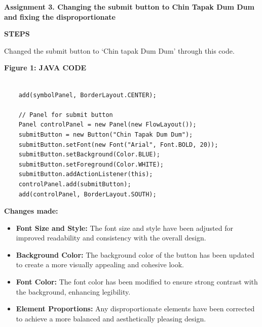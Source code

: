 \documentclass[a4paper,14pt]{article}
\begin{document}
\vspace{15pt}

\noindent\textbf{Assignment 3. Changing the submit button to Chin Tapak Dum Dum and fixing the disproportionate}

\vspace{15pt}
\begin{center}
\noindent\textbf{STEPS}

\vspace{15pt}

\noindent Changed the submit button to `Chin tapak Dum Dum' through this code.
\end{center}
\vspace{25pt}

\noindent\textbf{Figure 1: JAVA CODE}

\begin{verbatim}
    
    add(symbolPanel, BorderLayout.CENTER);
    
    // Panel for submit button
    Panel controlPanel = new Panel(new FlowLayout());
    submitButton = new Button("Chin Tapak Dum Dum");
    submitButton.setFont(new Font("Arial", Font.BOLD, 20));
    submitButton.setBackground(Color.BLUE);
    submitButton.setForeground(Color.WHITE);
    submitButton.addActionListener(this);
    controlPanel.add(submitButton);
    add(controlPanel, BorderLayout.SOUTH);

\end{verbatim}


\vspace{15pt}

\noindent\textbf{Changes made:}
\begin{itemize}[leftmargin=*]
    \item \textbf{Font Size and Style:} The font size and style have been adjusted for improved readability and consistency with the overall design.
    \item \textbf{Background Color:} The background color of the button has been updated to create a more visually appealing and cohesive look.
    \item \textbf{Font Color:} The font color has been modified to ensure strong contrast with the background, enhancing legibility.
    \item \textbf{Element Proportions:} Any disproportionate elements have been corrected to achieve a more balanced and aesthetically pleasing design.
\end{itemize}

\vspace{230pt}
\end{document}
